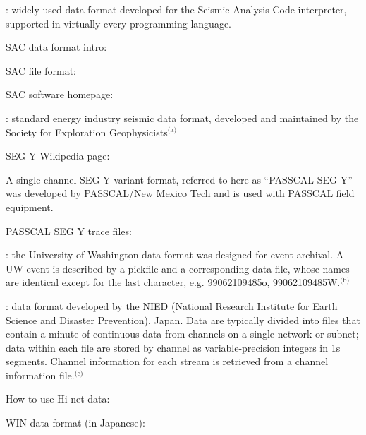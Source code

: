 \documentclass[letterpaper,11pt,english]{sphinxmanual}
\begin{document}
: widely-used data format developed for the Seismic Analysis Code interpreter, supported in virtually every programming language. %
\begin{footnote}[2]\sphinxAtStartFootnote
SAC data format intro: 
%
\end{footnote} %
\begin{footnote}[3]\sphinxAtStartFootnote
SAC file format: 
%
\end{footnote} %
\begin{footnote}[4]\sphinxAtStartFootnote
SAC software homepage: 
%
\end{footnote}

: standard energy industry seismic data format, developed and maintained by the Society for Exploration Geophysicists$^{\text{(a)}}$ %
\begin{footnote}[5]\sphinxAtStartFootnote
SEG Y Wikipedia page: 
%
\end{footnote} A single-channel SEG Y variant format, referred to here as “PASSCAL SEG Y” was developed by PASSCAL/New Mexico Tech and is used with PASSCAL field equipment. %
\begin{footnote}[6]\sphinxAtStartFootnote
PASSCAL SEG Y trace files: 
%
\end{footnote}

: the University of Washington data format was designed for event archival. A UW event is described by a pickfile and a corresponding data file, whose names are identical except for the last character, e.g. 99062109485o, 99062109485W.$^{\text{(b)}}$

 : data format developed by the NIED (National Research Institute for Earth Science and Disaster Prevention), Japan. Data are typically divided into files that contain a minute of continuous data from channels on a single network or subnet; data within each file are stored by channel as variable-precision integers in 1s segments. Channel information for each stream is retrieved from a channel information file.$^{\text{(c)}}$ %
\begin{footnote}[7]\sphinxAtStartFootnote
How to use Hi-net data: 
%
\end{footnote} %
\begin{footnote}[8]\sphinxAtStartFootnote
WIN data format (in Japanese): 
%
\end{footnote}
\end{document}
